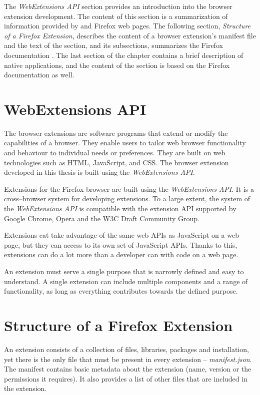 The \textit{WebExtensions API} section provides an introduction into the browser extension development. The content of this section is a summarization of information provided by \cite{chromeExtensions} and Firefox \cite{firefoxExtensions, firefoxAboutExtensios} web pages. The following section, \textit{Structure of a Firefox Extension}, describes the content of a browser extension's manifest file and the text of the section, and its subsections, summarizes the Firefox documentation \cite{extensionAnatomy, extensionIcnos, extensionContentScripts, extensionWebAccessibleResources}. The last section of the chapter contains a brief description of native applications, and the content of the section is based on the Firefox documentation \cite{extensionNativeMessaging} as well.

\section{WebExtensions API}
The browser extensions are software programs that extend or modify the capabilities of a browser. They enable users to tailor web browser functionality and behaviour to individual needs or preferences. They are built on web technologies such as HTML, JavaScript, and CSS. The browser extension developed in this thesis is built using the \textit{WebExtensions API}.

Extensions for the Firefox browser are built using the \textit{WebExtensions API}. It is a cross--browser system for developing extensions. To a large extent, the system of the \textit{WebExtensions API} is compatible with the extension API supported by Google Chrome, Opera and the W3C Draft Community Group.

Extensions cat take advantage of the same web APIs as JavaScript on a web page, but they can access to its own set of JavaScript APIs. Thanks to this, extensions can do a lot more than a developer can with code on a web page.

An extension must serve a single purpose that is narrowly defined and easy to understand. A single extension can include multiple components and a range of functionality, as long as everything contributes towards the defined purpose.

\section{Structure of a Firefox Extension}
An extension consists of a collection of files, libraries, packages and installation, yet there is the only file that must be present in every extension -- \textit{manifest.json}. The manifest contains basic metadata about the extension (name, version or the permissions it requires). It also provides a list of other files that are included in the extension.


